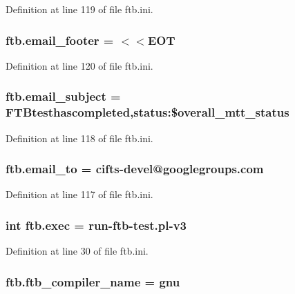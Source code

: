 Definition at line 119 of file ftb.\-ini.

\hypertarget{namespaceftb_a1945f3f78c2c8a76e10e5c6b6ab49edc}{
\subsubsection[{email\-\_\-footer}]{\setlength{\rightskip}{0pt plus 5cm}ftb.\-email\-\_\-footer = $<$$<$E\-O\-T}}\label{namespaceftb_a1945f3f78c2c8a76e10e5c6b6ab49edc}


Definition at line 120 of file ftb.\-ini.

\hypertarget{namespaceftb_a32d4c73434de192cc67e8c20def937a8}{
\subsubsection[{email\-\_\-subject}]{\setlength{\rightskip}{0pt plus 5cm}ftb.\-email\-\_\-subject = F\-T\-Btesthascompleted,status\-:\$overall\-\_\-mtt\-\_\-status}}\label{namespaceftb_a32d4c73434de192cc67e8c20def937a8}


Definition at line 118 of file ftb.\-ini.

\hypertarget{namespaceftb_af77d6a2460d34d47c8aa42d7d72c0100}{
\subsubsection[{email\-\_\-to}]{\setlength{\rightskip}{0pt plus 5cm}ftb.\-email\-\_\-to = cifts-\/devel@googlegroups.\-com}}\label{namespaceftb_af77d6a2460d34d47c8aa42d7d72c0100}


Definition at line 117 of file ftb.\-ini.

\hypertarget{namespaceftb_a3708045a4f84247896c658014c72ec9b}{
\subsubsection[{exec}]{\setlength{\rightskip}{0pt plus 5cm}int ftb.\-exec = run-\/ftb-\/test.\-pl-\/v3}}\label{namespaceftb_a3708045a4f84247896c658014c72ec9b}


Definition at line 30 of file ftb.\-ini.

\hypertarget{namespaceftb_ac13591e7257052189dfc8d0b56084713}{
\subsubsection[{ftb\-\_\-compiler\-\_\-name}]{\setlength{\rightskip}{0pt plus 5cm}ftb.\-ftb\-\_\-compiler\-\_\-name = gnu}}\label{namespaceftb_ac13591e7257052189dfc8d0b56084713}



